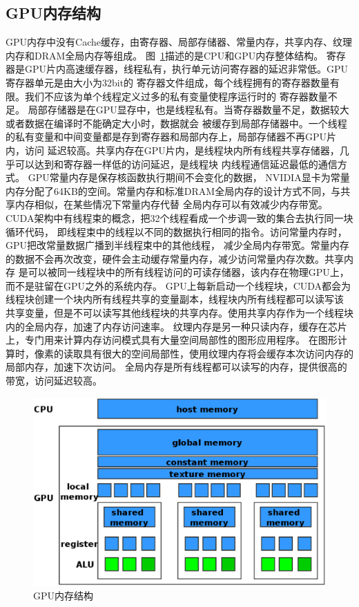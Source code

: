 \subsection{GPU内存结构}
GPU内存中没有Cache缓存，由寄存器、局部存储器、常量内存，共享内存、纹理内存和DRAM全局内存等组成。
图~\ref{figure2}描述的是CPU和GPU内存整体结构。
寄存器是GPU片内高速缓存器，线程私有，执行单元访问寄存器的延迟非常低。GPU寄存器单元是由大小为32bit的
寄存器文件组成，每个线程拥有的寄存器数量有限。我们不应该为单个线程定义过多的私有变量使程序运行时的
寄存器数量不足。
局部存储器是在GPU显存中，也是线程私有。当寄存器数量不足，数据较大或者数据在编译时不能确定大小时，数据就会
被缓存到局部存储器中。一个线程的私有变量和中间变量都是存到寄存器和局部内存上，局部存储器不再GPU片内，访问
延迟较高。共享内存在GPU片内，是线程块内所有线程共享存储器，几乎可以达到和寄存器一样低的访问延迟，是线程块
内线程通信延迟最低的通信方式。
GPU常量内存是保存核函数执行期间不会变化的数据，
NVIDIA显卡为常量内存分配了64KB的空间。常量内存和标准DRAM全局内存的设计方式不同，与共享内存相似，在某些情况下常量内存代替
全局内存可以有效减少内存带宽。CUDA架构中有线程束的概念，把32个线程看成一个步调一致的集合去执行同一块循环代码，
即线程束中的线程以不同的数据执行相同的指令。访问常量内存时，GPU把改常量数据广播到半线程束中的其他线程，
减少全局内存带宽。常量内存的数据不会再次改变，硬件会主动缓存常量内存，减少访问常量内存次数。共享内存
是可以被同一线程块中的所有线程访问的可读存储器，该内存在物理GPU上，而不是驻留在GPU之外的系统内存。
GPU上每新启动一个线程块，CUDA都会为线程块创建一个块内所有线程共享的变量副本，线程块内所有线程都可以读写该
共享变量，但是不可以读写其他线程块的共享内存。使用共享内存作为一个线程块内的全局内存，加速了内存访问速率。
纹理内存是另一种只读内存，缓存在芯片上，专门用来计算内存访问模式具有大量空间局部性的图形应用程序。
在图形计算时，像素的读取具有很大的空间局部性，使用纹理内存将会缓存本次访问内存的局部内存，加速下次访问。
全局内存是所有线程都可以读写的内存，提供很高的带宽，访问延迟较高。
\begin{figure}
\centering
\includegraphics[width=0.9\linewidth]{figure2.eps}
\caption{GPU内存结构}\label{figure2}
\end{figure}


